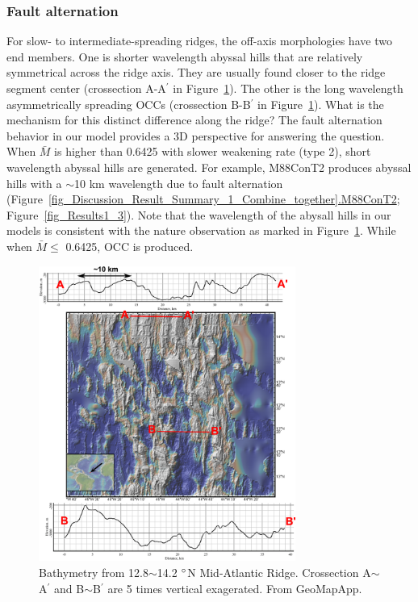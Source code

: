 \subsubsection{Fault alternation}

For slow- to intermediate-spreading ridges, the off-axis morphologies have two end members. One is shorter wavelength abyssal hills that are relatively symmetrical across the ridge axis. They are usually found closer to the ridge segment center (crossection A-A$^{\prime}$ in Figure~\hyperref[fig_Discussion_Observation_2_13-14N_MAR]{\ref{fig_Discussion_Observation_2_13-14N_MAR}}). The other is the long wavelength asymmetrically spreading OCCs (crossection B-B$^{\prime}$ in Figure~\hyperref[fig_Discussion_Observation_2_13-14N_MAR]{\ref{fig_Discussion_Observation_2_13-14N_MAR}}). What is the mechanism for this distinct difference along the ridge? The fault alternation behavior in our model provides a 3D perspective for answering the question. When $\bar{M}$ is higher than 0.6425 with slower weakening rate (type 2), short wavelength abyssal hills are generated. For example, M88ConT2 produces abyssal hills with a $\sim$10 km wavelength due to fault alternation (Figure~\hyperref[fig_Discussion_Result_Summary_1_Combine_together]{\ref{fig_Discussion_Result_Summary_1_Combine_together}.M88ConT2}; Figure~\hyperref[fig_Results1_3]{\ref{fig_Results1_3}}). Note that the wavelength of the abysall hills in our models is consistent with the nature observation as marked in Figure~\hyperref[fig_Discussion_Observation_2_13-14N_MAR]{\ref{fig_Discussion_Observation_2_13-14N_MAR}}. While when $\bar{M} \le$ 0.6425, OCC is produced.

\begin{figure}[h]
 \centering
  \includegraphics[width=0.75\textwidth]{./Figures/fig_Discussion_Observation_2_13-14N_MAR.eps}
 \caption[Bathymetry from 12.8$\sim$14.2 $\degree$N Mid-Atlantic Ridge.]{Bathymetry from 12.8$\sim$14.2 $\degree$N Mid-Atlantic Ridge. Crossection A$\sim$A$^{\prime}$ and B$\sim$B$^{\prime}$ are 5 times vertical exagerated. From GeoMapApp.}
 \label{fig_Discussion_Observation_2_13-14N_MAR}
\end{figure}

